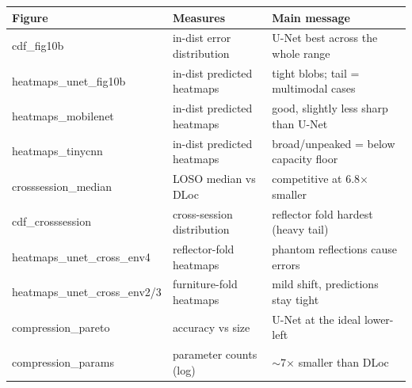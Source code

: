 \documentclass[11pt]{article}
\begin{document}
\begin{table}[h]\centering\footnotesize
\begin{tabular}{@{}lll@{}}
\toprule
\textbf{Figure} & \textbf{Measures} & \textbf{Main message} \\
\midrule
cdf\_fig10b                  & in-dist error distribution   & U-Net best across the whole range \\
heatmaps\_unet\_fig10b       & in-dist predicted heatmaps   & tight blobs; tail = multimodal cases \\
heatmaps\_mobilenet          & in-dist predicted heatmaps   & good, slightly less sharp than U-Net \\
heatmaps\_tinycnn            & in-dist predicted heatmaps   & broad/unpeaked = below capacity floor \\
crosssession\_median         & LOSO median vs DLoc          & competitive at 6.8$\times$ smaller \\
cdf\_crosssession            & cross-session distribution   & reflector fold hardest (heavy tail) \\
heatmaps\_unet\_cross\_env4  & reflector-fold heatmaps      & phantom reflections cause errors \\
heatmaps\_unet\_cross\_env2/3& furniture-fold heatmaps      & mild shift, predictions stay tight \\
compression\_pareto          & accuracy vs size             & U-Net at the ideal lower-left \\
compression\_params          & parameter counts (log)       & $\sim$7$\times$ smaller than DLoc \\
\bottomrule
\end{tabular}
\end{table}
\end{document}
